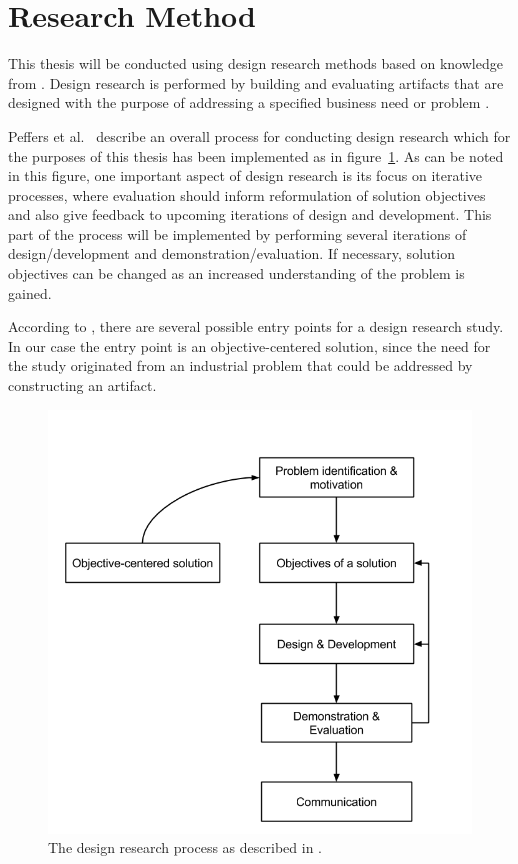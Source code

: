 \section{Research Method}
\label{method}
This thesis will be conducted using design research methods based on knowledge from \cite{DS, Peffers, DesignEval}. Design research is performed by building and evaluating artifacts that are designed with the purpose of addressing a specified business need or problem \cite{DS}. 

Peffers et al.\ \cite{Peffers} describe an overall process for conducting design research which for the purposes of this thesis has been implemented as in figure~\ref{fig:peffer}. As can be noted in this figure, one important aspect of design research is its focus on iterative processes, where evaluation should inform reformulation of solution objectives and also give feedback to upcoming iterations of design and development. This part of the process will be implemented by performing several iterations of design/development and demonstration/evaluation. If necessary, solution objectives can be changed as an increased understanding of the problem is gained. 

According to \cite{Peffers}, there are several possible entry points for a design research study. In our case the entry point is an objective-centered solution, since the need for the study originated from an industrial problem that could be addressed by constructing an artifact.
\begin{figure}[h!]
\centering
\includegraphics[width=0.7\pdfpagewidth]{figure/Peffer.png}
\caption{The design research process as described in \cite{Peffers}.}
\label{fig:peffer}
\end{figure}

